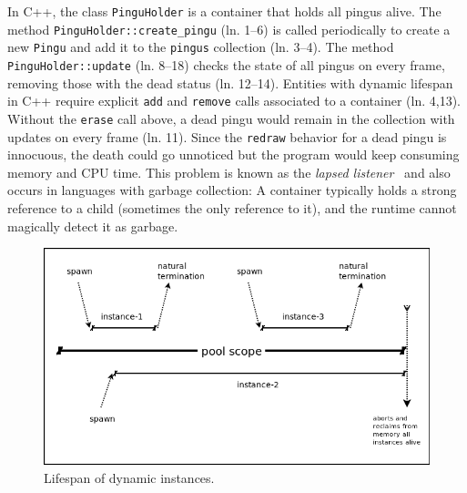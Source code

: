 \documentclass{vgtc}                          %
\newcommand{\code}[1] {{\small{\texttt{#1}}}}
\begin{document}
In C++, the class \code{PinguHolder} is a container that holds all pingus
alive.
%
The method \code{PinguHolder::create\_pingu} (ln. 1--6) is called periodically
to create a new \code{Pingu} and add it to the \code{pingus} collection
(ln. 3--4).
The method \code{PinguHolder::update} (ln. 8--18) checks the state of all
pingus on every frame, removing those with the dead status (ln. 12--14).
%
Entities with dynamic lifespan in C++ require explicit \code{add} and
\code{remove} calls associated to a container (ln. 4,13).
Without the \code{erase} call above, a dead pingu would remain in the
collection with updates on every frame (ln. 11).
Since the \code{redraw} behavior for a dead pingu is innocuous, the death could
go unnoticed but the program would keep consuming memory and CPU time.
This problem is known as the \emph{lapsed listener}~\cite{games.patters} and
also occurs in languages with garbage collection:
A container typically holds a strong reference to a child (sometimes the only 
reference to it), and the runtime cannot magically detect it as garbage.

\begin{figure}[t]
\centering
\includegraphics[width=\columnwidth]{pool}
\caption{Lifespan of dynamic instances.
\label{fig.pool}
}
\end{figure}
\end{document}
